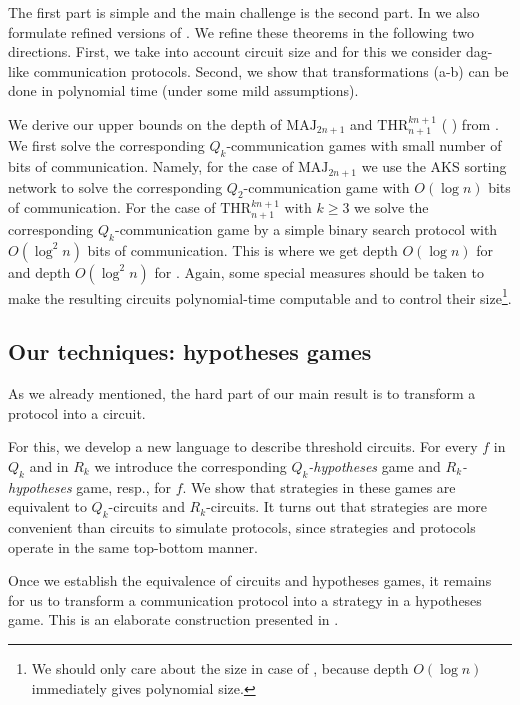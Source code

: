\documentclass{toc}
\def\MAJ{\mathrm{MAJ}}
\def\THR{\mathrm{THR}}
\begin{document}
The first part is simple and the main challenge is the second part. In  %
%
%
we also formulate refined versions of  . %
We  %
refine these theorems in the following two directions.
%
First,  %
we take into account circuit size and for this we consider dag-like communication protocols.  %
Second,  %
we show that transformations (a-b) can be done in polynomial time (under some mild assumptions). 

 We derive our  upper bounds on the depth of $\MAJ_{2n + 1}$ and $\THR^{kn + 1}_{n + 1}$ ( ) from . We first solve the corresponding $Q_k$-communication games with small number of bits of communication. Namely, for the case of $\MAJ_{2n + 1}$ we use the AKS sorting network to solve the corresponding $Q_2$-communication game with $O(\log n)$ bits of communication. For the case of $\THR^{kn + 1}_{n + 1}$ with $k\ge 3$ we solve the corresponding $Q_k$-communication game by a simple binary search protocol with $O(\log^2 n)$ bits of communication. This is where we get depth $O(\log n)$ for  and depth $O(\log^2 n)$ for . Again, some special measures should be taken to make the resulting circuits polynomial-time computable and to control their size\footnote{We should only care about the size in case of , because depth $O(\log n)$ immediately gives polynomial size.}.


\subsection{Our techniques: hypotheses games}

As we already mentioned, the hard part of our main result is to transform a protocol into a circuit. 



For this, we develop a new language to describe threshold circuits.
%
For  %
every $f$ in $Q_k$ %
and in $R_k$   %
we introduce the corresponding \emph{$Q_k$-hypotheses}
%
game and  \emph{$R_k$-hypotheses} game, resp.,  %
for $f$. We show that strategies in these games are equivalent to $Q_k$-circuits and $R_k$-circuits.
It turns out that strategies are more convenient than circuits to simulate protocols, since strategies and protocols operate in the same top-bottom manner.

Once we establish the equivalence of circuits and hypotheses games, it remains for us to transform a communication protocol into a strategy in a hypotheses game. This is an elaborate construction presented in  . %
\end{document}
